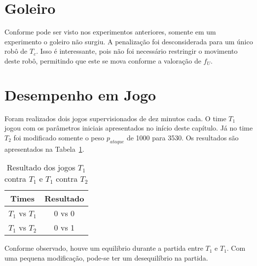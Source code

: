 
%
%
%




\section{Goleiro}
Conforme pode ser visto nos experimentos anteriores,
somente em um experimento o goleiro não surgiu.
A penalização foi desconsiderada para um
único robô de $T_c$. Isso é interessante, pois
não foi necessário restringir o movimento deste
robô, permitindo que este se mova conforme a
valoração de $f_U$.

\section{Desempenho em Jogo}
Foram realizados dois jogos supervisionados de dez minutos cada.
O time $T_1$ jogou com os parâmetros iniciais apresentados no
início deste capítulo. Já no time $T_2$ foi modificado
somente o peso $p_{ataque}$ de 1000 para 3530. Os resultados são apresentados
na Tabela~\ref{tab:games}.

\begin{table}[H]
  \begin{center}
  \begin{tabular}{|c|c|}
    \hline
    Times      & Resultado \\
    \hline
    $T_1$ vs $T_1$ &  0 vs 0   \\
    \hline
    $T_1$ vs $T_2$ &  0 vs 1   \\
    \hline
  \end{tabular}
  \caption{Resultado dos jogos $T_1$ contra $T_1$ e $T_1$ contra $T_2$}\label{tab:games}
  \end{center}
\end{table}

Conforme observado, houve um equilibrio durante a
partida entre $T_1$ e $T_1$. Com uma pequena
modificação, pode-se ter um desequilíbrio na
partida.
